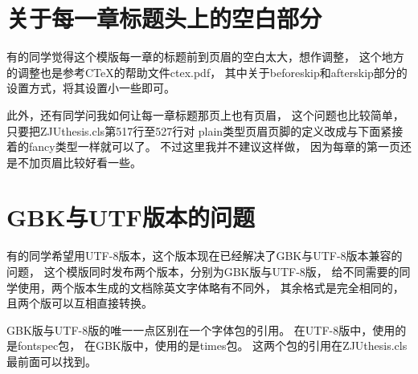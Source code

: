 \section{关于每一章标题头上的空白部分}

有的同学觉得这个模版每一章的标题前到页眉的空白太大，想作调整，
这个地方的调整也是参考CTeX的帮助文件ctex.pdf，
其中关于beforeskip和afterskip部分的设置方式，将其设置小一些即可。

此外，还有同学问我如何让每一章标题那页上也有页眉，
这个问题也比较简单，只要把ZJUthesis.cls第517行至527行对
plain类型页眉页脚的定义改成与下面紧接着的fancy类型一样就可以了。
不过这里我并不建议这样做，
因为每章的第一页还是不加页眉比较好看一些。


\section{GBK与UTF版本的问题}

有的同学希望用UTF-8版本，这个版本现在已经解决了GBK与UTF-8版本兼容的问题，
这个模版同时发布两个版本，分别为GBK版与UTF-8版，
给不同需要的同学使用，两个版本生成的文档除英文字体略有不同外，
其余格式是完全相同的，
且两个版可以互相直接转换。

GBK版与UTF-8版的唯一一点区别在一个字体包的引用。
在UTF-8版中，使用的是fontspec包，
在GBK版中，使用的是times包。
这两个包的引用在ZJUthesis.cls最前面可以找到。

